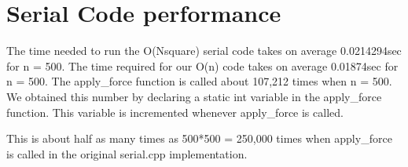\documentclass[11pt]{amsart}
\begin{document}
\section{Serial Code performance}

The time needed to run the O(Nsquare) serial code takes on average 0.0214294sec for n = 500.
The time required for our O(n) code takes on average 0.01874sec for n = 500.
The apply_force function is called about 107,212 times when n = 500. 
We obtained this number by declaring a static int variable in the apply_force function. This variable is incremented whenever apply_force is called.


This is about half as many times as 500*500 = 250,000 times when apply_force is called in the original serial.cpp implementation.
 
\end{document}
